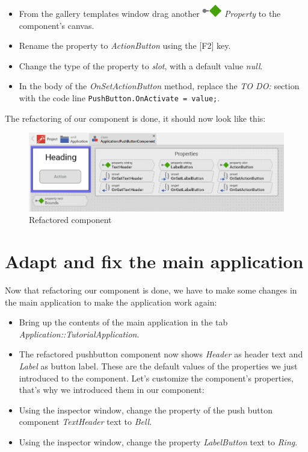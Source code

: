 \documentclass[
  a4paper,
,tablecaptionabove
]{scrbook}
\begin{document}
\begin{itemize}
\item
  From the gallery templates window drag another
  \includegraphics{./../asciidoc/modules/ROOT/assets/images/icons/PropertyIcon.png}
  \emph{Property} to the component's canvas.
\item
  Rename the property to \emph{ActionButton} using the {[}F2{]} key.
\item
  Change the type of the property to \emph{slot}, with a default value
  \emph{null}.
\item
  In the body of the \emph{OnSetActionButton} method, replace the
  \emph{TO DO:} section with the code line
  \texttt{PushButton.OnActivate\ =\ value;}.
\end{itemize}

The refactoring of our component is done, it should now look like this:

\begin{figure}
\centering
\includegraphics{./../asciidoc/modules/ROOT/assets/images/reusablecomponent/RefactoredComponent.png}
\caption{Refactored component}
\end{figure}

\hypertarget{_adapt_and_fix_the_main_application}{%
\section{Adapt and fix the main
application}\label{_adapt_and_fix_the_main_application}}

Now that refactoring our component is done, we have to make some changes
in the main application to make the application work again:

\begin{itemize}
\item
  Bring up the contents of the main application in the tab
  \emph{Application::TutorialApplication}.
\item
  The refactored pushbutton component now shows \emph{Header} as header
  text and \emph{Label} as button label. These are the default values of
  the properties we just introduced to the component. Let's customize
  the component's properties, that's why we introduced them in our
  component:
\item
  Using the inspector window, change the property of the push button
  component \emph{TextHeader} text to \emph{Bell}.
\item
  Using the inspector window, change the property \emph{LabelButton}
  text to \emph{Ring}.
\end{itemize}
\end{document}
